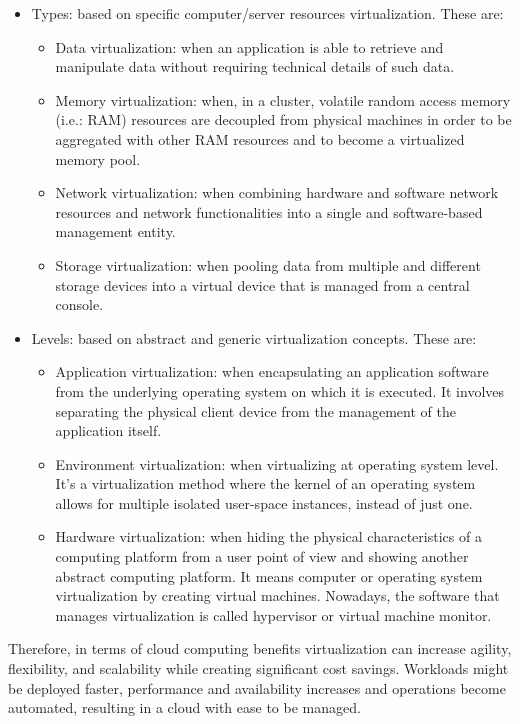 \begin{itemize}
\item Types: based on specific computer/server resources virtualization. These are: 
\begin{itemize}
\item Data virtualization: when an application is able to retrieve and manipulate data without requiring technical details of such data.
\item Memory virtualization: when, in a cluster, volatile random access memory (i.e.: RAM) resources are decoupled from physical machines in order to be aggregated with other RAM resources and to become a virtualized memory pool.
\item Network virtualization: when combining hardware and software network resources and network functionalities into a single and software-based management entity.
\item Storage virtualization: when pooling data from multiple and different storage devices into a virtual device that is managed from a central console.
\end{itemize}
\item Levels: based on abstract and generic virtualization concepts. These are:
\begin{itemize}
\item Application virtualization: when encapsulating an application software from the underlying operating system on which it is executed. It involves separating the physical client device from the management of the application itself.
\item Environment virtualization: when virtualizing at operating system level. It's a virtualization method where the kernel of an operating system allows for multiple isolated user-space instances, instead of just one. 
\item Hardware virtualization: when hiding the physical characteristics of a computing platform from a user point of view and showing another abstract computing platform. It means computer or operating system virtualization by creating virtual machines.  Nowadays, the software that manages virtualization is called hypervisor or virtual machine monitor.
\end{itemize}
\end{itemize}

Therefore, in terms of cloud computing benefits virtualization can increase agility, flexibility, and scalability while creating significant cost savings. Workloads might be deployed faster, performance and availability increases and operations become automated, resulting in a cloud with ease to be managed. 


